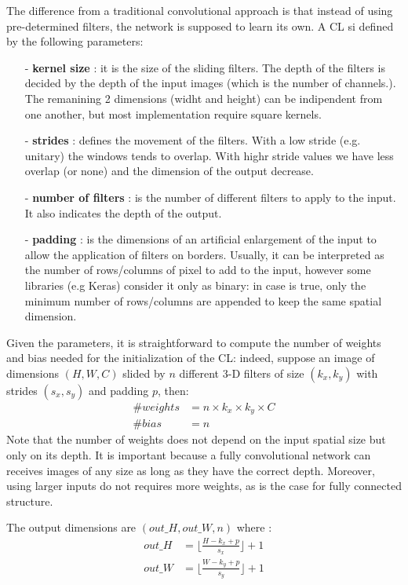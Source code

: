 \documentclass[12pt,a4paper]{report}
\begin{document}
The difference from a traditional convolutional approach is that instead of using pre-determined filters, the network is supposed to learn its own.
A CL si defined by the following parameters: 

\begin{itemize}
 \setlength\itemsep{-0.2em}
 \item [-] {\bf kernel size} : it is the size of the sliding filters. The depth of the filters is decided by the depth of the input images (which is the number of channels.). The remanining 2 dimensions (widht and height) can be indipendent from one another, but most implementation require square kernels.
 \item [-] {\bf strides} : defines the movement of the filters. With a low stride (e.g. unitary) the windows tends to overlap. With highr stride values we have less overlap (or none) and the dimension of the output decrease.
 \item [-] {\bf number of filters} : is the number of different filters to apply to the input. It also indicates the depth of the output.
 \item [-] {\bf padding} : is the dimensions of an artificial enlargement of the input to allow the application of filters on borders. Usually, it can be interpreted as the number of rows/columns of pixel to add to the input, however some libraries (e.g Keras) consider it only as binary: in case is true, only the minimum number of rows/columns are appended to keep the same spatial dimension.
\end{itemize}
Given the parameters, it is straightforward to compute the number of weights and bias needed for the initialization of the CL: indeed, suppose an image of dimensions $(H, W, C)$ slided by $n$ different 3-D filters of size $(k_x, k_y)$ with strides $(s_x, s_y)$ and padding $p$, then:
\begin{align}
 \# weights &= n \times k_x \times k_y \times C \\
 \# bias &= n
\end{align}
Note that the number of weights does not depend on the input spatial size but only on its depth. It is important because a fully convolutional network can receives images of any size as long as they have the correct depth. Moreover, using larger inputs do not requires more weights, as is the case for fully connected structure. 

The output dimensions are $(out\_H, out\_W, n)$ where :
\begin{align}
 out\_H &= \lfloor\frac{H - k_x + p}{s_x}\rfloor + 1 \\
 out\_W &= \lfloor\frac{W - k_y + p}{s_y}\rfloor + 1
\end{align}
\end{document}
